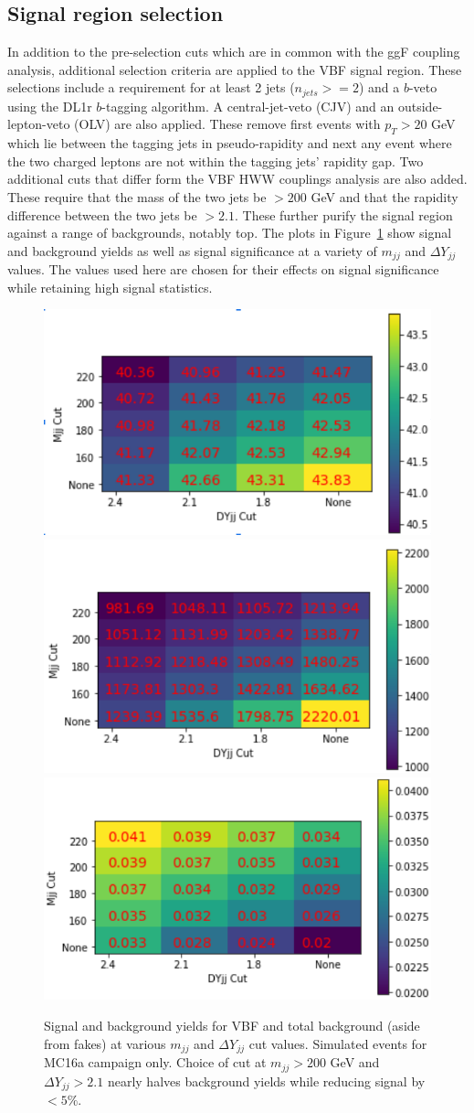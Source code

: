 \subsection{Signal region selection}
In addition to the pre-selection cuts which are in common with the ggF coupling analysis, additional selection criteria are applied to the VBF signal region. These selections include a requirement for at least 2 jets ($n_{jets}>=2$) and a $b$-veto using the DL1r $b$-tagging algorithm. A central-jet-veto (CJV) and an outside-lepton-veto (OLV) are also applied. These remove first events with $p_T >20$ GeV which lie between the tagging jets in pseudo-rapidity and next any event where the two charged leptons are not within the tagging jets' rapidity gap. Two additional cuts that differ form the VBF HWW couplings analysis are also added. These require that the mass of the two jets be $>200$ GeV and that the rapidity difference between the two jets be $>2.1$. These further purify the signal region against a range of backgrounds, notably top. The plots in Figure~\ref{fig:MjjDYjjSig} show signal and background yields as well as signal significance at a variety of $m_{jj}$ and $\Delta Y_{jj}$ values. The values used here are chosen for their effects on signal significance while retaining high signal statistics. 

\begin{figure}[!htbp]
\centering
\includegraphics[width=.3\linewidth]{Pictures/MjjDYjjVBF.png}
\includegraphics[width=.3\linewidth]{Pictures/MjjDYjjBackground.png}
\includegraphics[width=.3\linewidth]{Pictures/MjjDYjjSig.png}
\caption{Signal and background yields for VBF and total background (aside from fakes) at various $m_{jj}$ and $\Delta Y_{jj}$ cut values. Simulated events for MC16a campaign only. Choice of cut at $m_{jj}>200$ GeV and $\Delta Y_{jj}>2.1$ nearly halves background yields while reducing signal by $<5\%$.}
\label{fig:MjjDYjjSig}
\end{figure}

